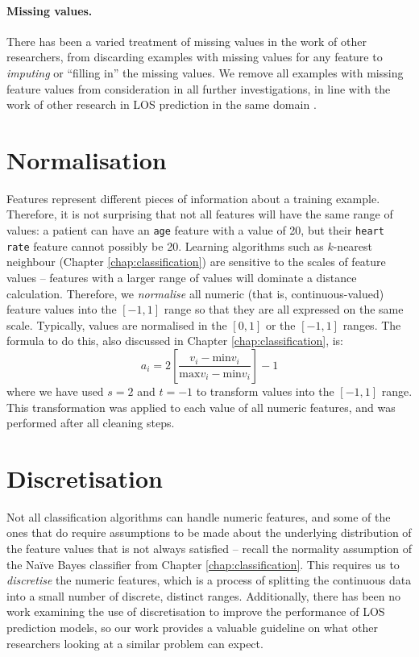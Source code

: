 \paragraph{Missing values.}
There has been a varied treatment of missing values in the work of other
researchers, from discarding examples with missing values for any feature
to \textit{imputing} or ``filling in'' the missing values. We remove all
examples with missing feature values from consideration in all further
investigations, in line with the work of other research in LOS prediction
in the same domain \cite{Dinh2013a}.

\section{Normalisation}
Features represent different pieces of information about a training example.
Therefore, it is not surprising that not all features will have the same range
of values: a patient can have an \texttt{age} feature with a value of 20, but
their \texttt{heart rate} feature cannot possibly be 20. Learning algorithms
such as $k$-nearest neighbour (Chapter \ref{chap:classification})
are sensitive to the scales of feature values -- features with a larger range
of values will dominate a distance calculation. Therefore, we
\textit{normalise} all numeric (that is, continuous-valued)
feature values into the $[-1,1]$ range so that they are all expressed on the
same scale. Typically, values are normalised in the $[0,1]$ or the $[-1,1]$
ranges.
The formula to do this, also discussed in Chapter \ref{chap:classification},
is:
\begin{equation*}
a_i = 2\left[\dfrac{v_i - \mathrm{min }v_i}{\mathrm{max }v_i - \mathrm{min }v_i}\right] - 1
\end{equation*}
where we have used $s=2$ and $t=-1$ to transform values into the $[-1,1]$
range. This transformation was applied to each value of all numeric features,
and was performed after all cleaning steps.

\section{Discretisation}
Not all classification algorithms can handle numeric features, and some of the
ones that do require assumptions to be made about the underlying distribution
of the feature values that is not always satisfied -- recall the normality
assumption of the Na\"{i}ve Bayes classifier
from Chapter \ref{chap:classification}. This requires us
to \textit{discretise} the numeric features, which is a process of splitting
the continuous data into a small number of discrete, distinct ranges.
Additionally, there has been no work examining the use of discretisation to
improve the performance of LOS prediction models, so our work provides a
valuable guideline on what other researchers looking at a similar problem can
expect.

